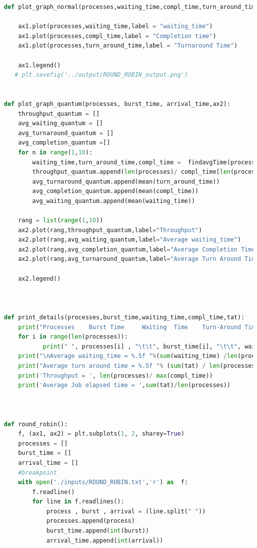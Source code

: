 \documentclass[11pt,a4paper]{report}
\begin{document}
\begin{lstlisting}[language=Python,caption = Round Robin Source Code,breaklines=true,postbreak=\mbox{\textcolor{red}{$\hookrightarrow$}\space},]
def plot_graph_normal(processes,waiting_time,compl_time,turn_around_time,ax1):
    
    ax1.plot(processes,waiting_time,label = "waiting_time")
    ax1.plot(processes,compl_time,label = "Completion time")
    ax1.plot(processes,turn_around_time,label = "Turnaround Time")

    ax1.legend()
   # plt.savefig('../output/ROUND_ROBIN_output.png')


def plot_graph_quantum(processes, burst_time, arrival_time,ax2):
    throughput_quantum = []
    avg_waiting_quantum = []
    avg_turnaround_quantum = []
    avg_completion_quantum =[]
    for n in range(1,10):
        waiting_time,turn_around_time,compl_time =  findavgTime(processes, len(processes), burst_time, arrival_time, n) 
        throughput_quantum.append(len(processes)/ compl_time[len(processes)-1])
        avg_turnaround_quantum.append(mean(turn_around_time))
        avg_completion_quantum.append(mean(compl_time))
        avg_waiting_quantum.append(mean(waiting_time))

    rang = list(range(1,10))
    ax2.plot(rang,throughput_quantum,label="Throughput")
    ax2.plot(rang,avg_waiting_quantum,label="Average waiting_time")
    ax2.plot(rang,avg_completion_quantum,label="Average Completion Time")
    ax2.plot(rang,avg_turnaround_quantum,label="Average Turn Around Time")

    ax2.legend()



def print_details(processes,burst_time,waiting_time,compl_time,tat):
    print("Processes    Burst Time     Waiting  Time    Turn-Around Time    Completion Time") 
    for i in range(len(processes)):
           print(" ", processes[i] , "\t\t", burst_time[i], "\t\t", waiting_time[i], "\t\t", tat[i],"\t\t",compl_time[i]) 
    print("\nAverage waiting_time = %.5f "%(sum(waiting_time) /len(processes)) ) 
    print("Average turn around time = %.5f "% (sum(tat) / len(processes)))  
    print('Throughput = ', len(processes)/ max(compl_time))
    print('Average Job elapsed time = ',sum(tat)/len(processes))



def round_robin():
    f, (ax1, ax2) = plt.subplots(1, 2, sharey=True)
    processes = []
    burst_time = []
    arrival_time = []
    #breakpoint
    with open('./inputs/ROUND_ROBIN.txt','r') as  f:
        f.readline()
        for line in f.readlines():
            process , burst , arrival = (line.split(" "))
            processes.append(process)
            burst_time.append(int(burst))
            arrival_time.append(int(arrival))



\end{lstlisting}
\end{document}
